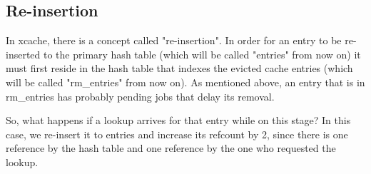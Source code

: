 \begin{comment}
The refcount model in xcache should be familiar to most people:

\begin{itemize}
	\item When an entry is inserted in cache, the cache holds a reference 
		for it (ref = 1).
	\item Whenever a new lookup for this cache entry succeeds, the reference 
		is increased by 1 (ref++)
	\item When the request that has issued the lookup has finished with an 
		entry, the reference is decreased by 1. (ref--)
	\item When a cache entry is evicted by cache, the its ref is decreased 
		by 1. (ref--)
\end{itemize}

Some common refcount cases are:

\begin{itemize}
	\item active entry with pending jobs (ref > 1)
	\item active entry with no pending jobs (ref = 1)
	\item evicted entry with pending jobs (ref > 0)
	\item evicted entry with no pending jobs (ref = 0)
\end{itemize}

and, as always, the entry is freed only when its ref = 0.

Finally, xcache uses one lock for each hash table but when a cache entry shifts
from one hash table to the other, both locks are acquired.

\end{comment}

\subsection{Re-insertion}

In xcache, there is a concept called "re-insertion". In order for an entry to
be re-inserted to the primary hash table (which will be called "entries" from
now on) it must first reside in the hash table that indexes the evicted cache
entries (which will be called "rm\_entries" from now on). As mentioned above,
an entry that is in rm\_entries has probably pending jobs that delay its
removal.

So, what happens if a lookup arrives for that entry while on this stage? In
this case, we re-insert it to entries and increase its refcount by 2, since
there is one reference by the hash table and one reference by the one who
requested the lookup.

